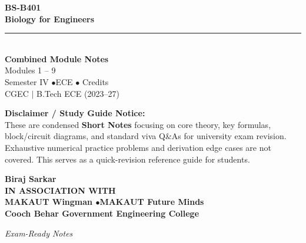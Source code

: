 \documentclass[12pt,a4paper]{article}
\begin{document}
\thispagestyle{empty}


\vspace*{1.0cm}
\begin{center}
  {\Huge\bfseries\color{myred} BS-B401}\\[10pt]
  {\LARGE\bfseries\color{mydark} Biology for Engineers}\\[20pt]
  {\color{myred}\rule{0.7\linewidth}{1.5pt}}\\[18pt]
  {\Large\color{myteal}\textbf{Combined Module Notes}}\\[8pt]
  {\large\color{mydark} Modules 1 -- 9}\\[40pt]
  {\normalsize\color{mydark} Semester IV \quad$\bullet$\quad ECE \quad$\bullet$ Credits}\\[12pt]
  {\normalsize\color{mydark} CGEC \;$|$\; B.Tech ECE (2023--27)}
\end{center}
\vspace{1.0cm}
\begin{center}
  \begin{tcolorbox}[colback=mygray, colframe=mgframe, boxrule=0.5pt, arc=3pt, width=0.85\linewidth]
    \centering\small\color{mydark}
    \textbf{Disclaimer / Study Guide Notice:}\\
    These are condensed \textbf{Short Notes} focusing on core theory, key formulas, block/circuit diagrams, and standard viva Q\&As for university exam revision. Exhaustive numerical practice problems and derivation edge cases are not covered. This serves as a quick-revision reference guide for students.
  \end{tcolorbox}
\end{center}
\vfill
\vspace{0.6cm}
\begin{center}
  {\large\bfseries\color{mypurple} Biraj Sarkar}\\[16pt]
  {\footnotesize\color{watermark}\textbf{IN ASSOCIATION WITH}}\\[8pt]
  {\small\bfseries\color{mydark} MAKAUT Wingman \quad$\bullet$\quad MAKAUT Future Minds}\\[12pt]
  {\large\bfseries\color{myteal} Cooch Behar Government Engineering College}
\end{center}
\vfill
\begin{center}{\small\color{watermark}\textit{Exam-Ready Notes}}\end{center}
\clearpage
\end{document}
